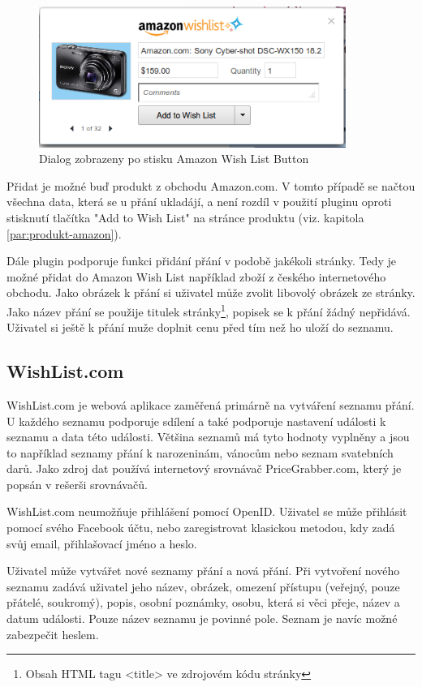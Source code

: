 \begin{figure}[htb]
\begin{center}
\includegraphics[width=100mm]{./pictures/amazon-wishlist-plugin.png}
\caption{Dialog zobrazeny po stisku Amazon Wish List Button}
\label{fig:amazon-wishlist-plugin}
\end{center}
\end{figure}

Přidat je možné buď produkt z obchodu Amazon.com. V tomto případě se načtou všechna data, která se u přání ukladájí, a není rozdíl v použití pluginu oproti stisknutí tlačítka "Add to Wish List" na stránce produktu (viz. kapitola \ref{par:produkt-amazon}).

Dále plugin podporuje funkci přidání přání v podobě jakékoli stránky. Tedy je možné přidat do Amazon Wish List například zboží z českého internetového obchodu. Jako obrázek k přání si uživatel může zvolit libovolý obrázek ze stránky. Jako název přání se použije titulek stránky\footnote{Obsah HTML tagu <title> ve zdrojovém kódu stránky}, popisek se k přání žádný nepřidává. Uživatel si ještě k přání muže doplnit cenu před tím než ho uloží do seznamu.

\subsection{WishList.com}
WishList.com je webová aplikace zaměřená primárně na vytváření seznamu přání. U každého seznamu podporuje sdílení a také podporuje nastavení události k seznamu a data této události. Většina seznamů má tyto hodnoty vyplněny a jsou to například seznamy přání k narozeninám, vánocům nebo seznam svatebních darů. Jako zdroj dat používá internetový srovnávač PriceGrabber.com, který je popsán v rešerši srovnávačů.

WishList.com neumožňuje přihlášení pomocí OpenID. Uživatel se může přihlásit pomocí svého Facebook účtu, nebo zaregistrovat klasickou metodou, kdy zadá svůj email, přihlašovací jméno a heslo.

Uživatel může vytvářet nové seznamy přání a nová přání. Při vytvoření nového seznamu zadává uživatel jeho název, obrázek, omezení přístupu (veřejný, pouze přátelé, soukromý), popis, osobní poznámky, osobu, která si věci přeje, název a datum události. Pouze název seznamu je povinné pole. Seznam je navíc možné zabezpečit heslem.

